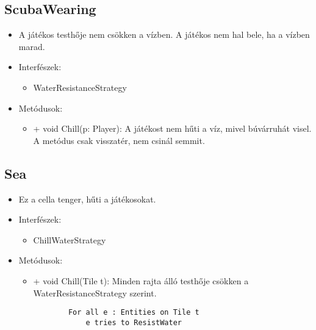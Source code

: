 \subsection{ScubaWearing}
\begin{itemize}
	\item A játékos testhője nem csökken a vízben. A játékos nem hal bele, ha a vízben marad.
	\item Interfészek:
	\begin{itemize}
		\item WaterResistanceStrategy
	\end{itemize}
	\item Metódusok:
	\begin{itemize}
		\item + void Chill(p: Player): A játékost nem hűti a víz, mivel búvárruhát visel. A metódus csak visszatér, nem csinál semmit.
	\end{itemize}
\end{itemize}

\subsection{Sea}
\begin{itemize}
	\item Ez a cella tenger, hűti a játékosokat.
	\item Interfészek:
	\begin{itemize}
		\item ChillWaterStrategy
	\end{itemize}
	\item Metódusok:
	\begin{itemize}
		\item + void Chill(Tile t): Minden rajta álló testhője csökken a WaterResistanceStrategy szerint.
		\begin{lstlisting}
		For all e : Entities on Tile t
			e tries to ResistWater
		\end{lstlisting}
	\end{itemize}
\end{itemize}

